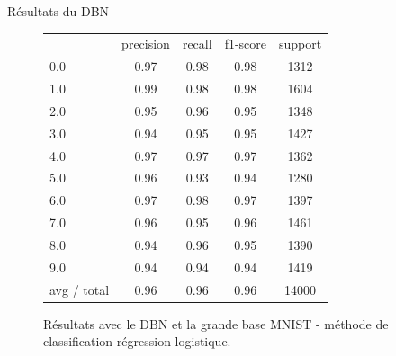\begin{frame}{Résultats du DBN}
	\begin{figure}[ht!]
	\centering
	\begin{tabular}{l|c|c|c|c}
           &  precision&    recall&  f1-score&   support\\
        0.0&       0.97 &     0.98 &     0.98 &     1312\\
        1.0 &      0.99  &    0.98  &    0.98  &    1604\\
        2.0  &     0.95   &   0.96   &   0.95   &   1348\\
        3.0   &    0.94    &  0.95    &  0.95    &  1427\\
        4.0    &   0.97     & 0.97     & 0.97     & 1362\\
        5.0      & 0.96      &0.93      &0.94      &1280\\
        6.0     &  0.97&      0.98&      0.97&      1397\\
        7.0       &0.96 &     0.95 &     0.96 &     1461\\
        8.0&       0.94  &    0.96  &    0.95  &    1390\\
        9.0 &      0.94   &   0.94   &   0.94   &   1419\\
avg / total   &    0.96     & 0.96    &  0.96    & 14000
	\end{tabular}
	\caption{Résultats avec le DBN et la grande base MNIST - méthode de classification régression logistique.}
	\end{figure} 
\end{frame}